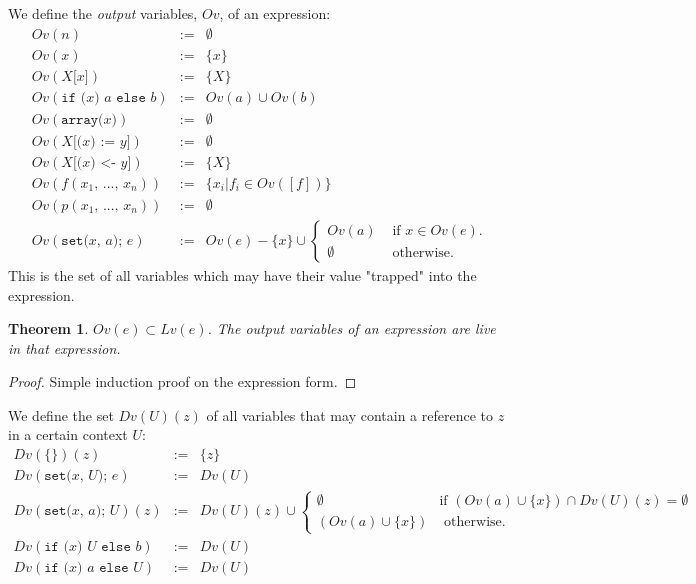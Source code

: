 \documentclass[12pt,a4paper]{article}
\newcommand{\cl}[1]{\texttt{#1}}
\newtheorem{theorem}{Theorem}
\newcommand{\ucont}[1]{\{#1\}}
\begin{document}
We define the \emph{output} variables, $Ov$, of an expression:
\begin{eqnarray*}
Ov( n ) & := & \emptyset \\
Ov( x ) & := & \{ x \} \\
Ov( X\cl{[}x\cl{]} ) & := & \{ X \} \\
Ov( \cl{if (} x \cl{) } a \cl{ else } b ) & := & Ov(a) \cup Ov(b) \\
Ov( \cl{array(} x \cl{)} ) & := & \emptyset \\
Ov( X \cl{[(} x \cl{) := } y \cl{]} ) & := & \emptyset \\
Ov( X \cl{[(} x \cl{) <- } y \cl{]} ) & := & \{ X \} \\
Ov( f(x_1 \cl{, } ... \cl{, } x_n) ) & := & \{ x_i | f_i \in Ov([f]) \} \\
Ov( p(x_1 \cl{, } ... \cl{, } x_n) ) & := & \emptyset \\
Ov( \cl{set(} x \cl{, } a \cl{); } e ) &:=& Ov(e) - \{x\} \cup \left\lbrace \begin{array}{ll}
Ov(a) & \text{ if $x \in Ov(e)$.} \\
\emptyset & \text{ otherwise.}
\end{array} \right.
\end{eqnarray*}
This is the set of all variables which may have their value "trapped" into the expression.

\begin{theorem}
$Ov(e) \subset Lv(e)$. The output variables of an expression are live in that expression.
\end{theorem}
\begin{proof}
Simple induction proof on the expression form.
\end{proof}


We define the set $Dv(U)(z)$ of all variables that may contain a reference to $z$ in a certain context $U$:
\begin{eqnarray*}
Dv(\ucont{})(z) &:=& \{ z \} \\
Dv( \cl{set(} x \cl{, } U \cl{); } e ) &:=& Dv(U) \\
Dv( \cl{set(} x \cl{, } a \cl{); } U )(z) &:=& Dv(U)(z) \cup
  \left\lbrace \begin{array}{ll}
  \emptyset & \text{if } (Ov(a) \cup \{ x \}) \cap Dv(U)(z) = \emptyset \\
  (Ov(a) \cup \{ x \}) & \text{ otherwise.}
  \end{array} \right. \\
Dv(\cl{if (} x \cl{) } U \cl{ else } b) &:=& Dv(U) \\
Dv(\cl{if (} x \cl{) } a \cl{ else } U) &:=& Dv(U) 
\end{eqnarray*}
\end{document}
